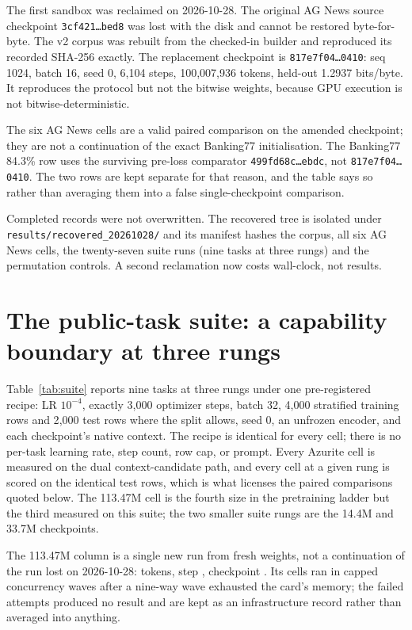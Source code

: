 The first sandbox was reclaimed on 2026-10-28. The original AG News source
checkpoint \texttt{3cf421\ldots bed8} was lost with the disk and cannot be restored
byte-for-byte. The v2 corpus was rebuilt from the checked-in builder and
reproduced its recorded SHA-256 exactly. The replacement checkpoint is
\texttt{817e7f04\ldots0410}: seq 1024, batch 16, seed 0, 6,104 steps,
100,007,936 tokens, held-out 1.2937 bits/byte. It reproduces the protocol but not
the bitwise weights, because GPU execution is not bitwise-deterministic.

The six AG News cells are a valid paired comparison on the amended checkpoint;
they are not a continuation of the exact Banking77 initialisation. The Banking77
84.3\% row uses the surviving pre-loss comparator
\texttt{499fd68c\ldots ebdc}, not \texttt{817e7f04\ldots0410}. The two rows are
kept separate for that reason, and the table says so rather than averaging them
into a false single-checkpoint comparison.

Completed records were not overwritten. The recovered tree is isolated under
\texttt{results/recovered\_20261028/} and its manifest hashes the corpus, all six
AG News cells, the twenty-seven suite runs (nine tasks at three rungs) and the permutation controls. A second
reclamation now costs wall-clock, not results.

\section{The public-task suite: a capability boundary at three rungs}
\label{sec:suite}

Table~\ref{tab:suite} reports nine tasks at three rungs under one pre-registered
recipe: LR \(10^{-4}\), exactly 3{,}000 optimizer steps, batch 32, 4{,}000
stratified training rows and 2{,}000 test rows where the split allows, seed 0,
an unfrozen encoder, and each checkpoint's native context. The recipe is
identical for every cell; there is no per-task learning rate, step count, row
cap, or prompt. Every Azurite cell is measured on the dual context-candidate
path, and every cell at a given rung is scored on the identical test rows, which
is what licenses the paired comparisons quoted below. The 113.47M cell is the
fourth size in the pretraining ladder but the third measured on this suite; the
two smaller suite rungs are the 14.4M and 33.7M checkpoints.

The 113.47M column is a single new run from fresh weights, not a continuation of
the run lost on 2026-10-28: \SuiteCkptLargeTokens{} tokens, step
\SuiteCkptLargeStep, checkpoint \SuiteCkptLarge. Its cells ran in capped
concurrency waves after a nine-way wave exhausted the card's memory; the failed
attempts produced no result and are kept as an infrastructure record rather than
averaged into anything.


